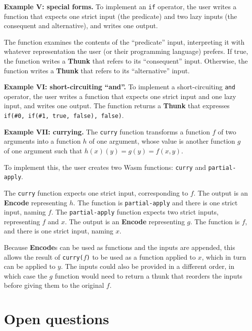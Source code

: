 \documentclass{article}
\newcommand{\encode}{\textbf{Encode}\xspace}
\newcommand{\thunk}{\textbf{Thunk}\xspace}
\newcommand{\encodes}{\textbf{Encode}s\xspace}
\begin{document}
\textbf{Example V: special forms.} To implement an \texttt{if}
operator, the user writes a function that expects one strict
input (the predicate) and two lazy inputs (the consequent and
alternative), and writes one output.

The function examines the contents of the ``predicate'' input,
interpreting it with whatever representation the user (or their
programming language) prefers. If true, the function writes a \thunk
that refers to its ``consequent'' input. Otherwise, the function
writes a \thunk that refers to its ``alternative'' input.

\textbf{Example VI: short-circuiting ``and''.} To implement a
short-circuiting \texttt{and} operator, the user writes a function
that expects one strict input and one lazy input, and writes
one output. The function returns a \thunk that expresses \texttt{if(\#0,
  if(\#1, true, false), false)}.

\textbf{Example VII: currying.} The \texttt{curry} function transforms
a function $f$ of two arguments into a function $h$ of one argument,
whose value is another function $g$ of one argument such that $h(x)(y) =
g(y) = f(x,y)$.

To implement this, the user creates two Wasm functions: \texttt{curry} and \texttt{partial-apply}.

The \texttt{curry} function expects one strict input, corresponding to
$f$.  The output is an \encode representing $h$. The function is
\texttt{partial-apply} and there is one strict input, naming $f$. The
\texttt{partial-apply} function expects two strict inputs,
representing $f$ and $x$. The output is an \encode representing
$g$. The function is $f$, and there is one strict input, naming $x$.

Because \encodes can be used as functions and the inputs are appended,
this allows the result of \texttt{curry($f$)} to be used as a function
applied to $x$, which in turn can be applied to $y$. The inputs could
also be provided in a different order, in which case the $g$ function would
need to return a thunk that reorders the inputs before giving them to
the original $f$.

\section{Open questions}
\end{document}
